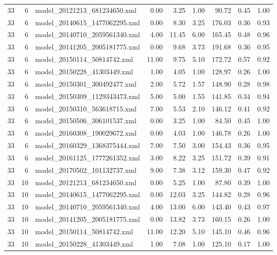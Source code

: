 \begin{table}[ht]
\begin{tabular}{rrlrrrrrr}
   33 &   6 & model\_20121213\_681234650.xml & 0.00 & 3.25 & 1.00 & 90.72 & 0.45 & 1.00 \\ 
   33 &   6 & model\_20140615\_1477062295.xml & 0.00 & 8.30 & 3.25 & 176.03 & 0.36 & 0.93 \\ 
   33 &   6 & model\_20140710\_2059561340.xml & 4.00 & 11.45 & 6.00 & 165.45 & 0.48 & 0.96 \\ 
   33 &   6 & model\_20141205\_2005181775.xml & 0.00 & 9.68 & 3.73 & 191.68 & 0.36 & 0.95 \\ 
   33 &   6 & model\_20150114\_50814742.xml & 11.00 & 9.75 & 5.10 & 172.72 & 0.57 & 0.92 \\ 
   33 &   6 & model\_20150228\_41303449.xml & 1.00 & 4.05 & 1.00 & 128.97 & 0.26 & 1.00 \\ 
   33 &   6 & model\_20150301\_300492477.xml & 2.00 & 5.72 & 1.57 & 148.90 & 0.28 & 0.98 \\ 
   33 &   6 & model\_20150309\_1129343473.xml & 5.00 & 5.00 & 1.55 & 141.85 & 0.34 & 0.94 \\ 
   33 &   6 & model\_20150310\_563618715.xml & 7.00 & 5.53 & 2.10 & 146.12 & 0.41 & 0.92 \\ 
   33 &   6 & model\_20150506\_306101537.xml & 0.00 & 3.25 & 1.00 & 84.50 & 0.45 & 1.00 \\ 
   33 &   6 & model\_20160308\_190029672.xml & 0.00 & 4.03 & 1.00 & 146.78 & 0.26 & 1.00 \\ 
   33 &   6 & model\_20160329\_1368375444.xml & 7.00 & 7.50 & 3.00 & 154.43 & 0.36 & 0.95 \\ 
   33 &   6 & model\_20161125\_1777261352.xml & 3.00 & 8.22 & 3.25 & 151.72 & 0.39 & 0.91 \\ 
   33 &   6 & model\_20170502\_101132737.xml & 9.00 & 7.38 & 3.12 & 159.30 & 0.47 & 0.92 \\ 
   33 &  10 & model\_20121213\_681234650.xml & 0.00 & 5.25 & 1.00 & 87.80 & 0.39 & 1.00 \\ 
   33 &  10 & model\_20140615\_1477062295.xml & 0.00 & 12.03 & 3.25 & 144.82 & 0.28 & 0.96 \\ 
   33 &  10 & model\_20140710\_2059561340.xml & 4.00 & 13.00 & 6.00 & 143.40 & 0.43 & 0.97 \\ 
   33 &  10 & model\_20141205\_2005181775.xml & 0.00 & 13.82 & 3.73 & 160.15 & 0.26 & 1.00 \\ 
   33 &  10 & model\_20150114\_50814742.xml & 11.00 & 12.20 & 5.10 & 145.10 & 0.46 & 0.96 \\ 
   33 &  10 & model\_20150228\_41303449.xml & 1.00 & 7.08 & 1.00 & 125.10 & 0.17 & 1.00 \\ 

\end{tabular}
\end{table}
